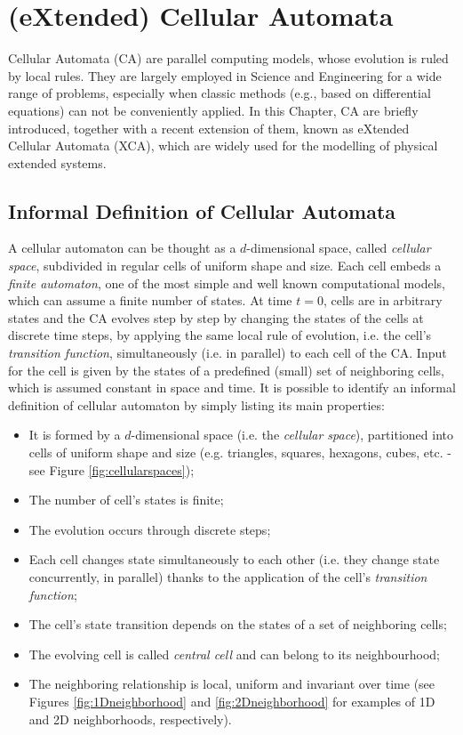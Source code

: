 \chapter{(eXtended) Cellular Automata}

Cellular Automata (CA) are parallel computing models, whose evolution
is ruled by local rules. They are largely employed in Science and
Engineering for a wide range of problems, especially when classic
methods (e.g., based on differential equations) can not be conveniently
applied. In this Chapter, CA are briefly introduced, together with a
recent extension of them, known as eXtended Cellular Automata (XCA),
which are widely used for the modelling of physical extended systems.


\section{Informal Definition of Cellular Automata}

A cellular automaton can be thought as a $d$-dimensional space, called
\emph{cellular space}, subdivided in regular cells of uniform shape
and size. Each cell embeds a \emph{finite automaton}, one of
the most simple and well known computational models, which can assume a finite number of states. At time $t=0$,
cells are in arbitrary states and the CA evolves step by step by
changing the states of the cells at discrete time steps, by applying
the same local rule of evolution, i.e. the cell's \emph{transition
  function}, simultaneously (i.e. in parallel) to each cell of the
CA. Input for the cell is given by the states of a predefined (small) set of
neighboring cells, which is assumed constant in space and time. It is
possible to identify an informal definition of cellular automaton by
simply listing its main properties:

\begin{itemize}
\item It is formed by a $d$-dimensional space (i.e. the \emph{cellular
  space}), partitioned into cells of uniform shape and size
  (e.g. triangles, squares, hexagons, cubes, etc. - see Figure
  \ref{fig:cellularspaces});
\item The number of cell's states is finite;
\item The evolution occurs through discrete steps;
\item Each cell changes state simultaneously to each other (i.e. they
  change state concurrently, in parallel) thanks to the application of
  the cell's \emph{transition function};
\item The cell's state transition depends on the states of a set of neighboring cells;
\item The evolving cell is called \emph{central cell} and can belong
  to its neighbourhood;
\item The neighboring relationship is local, uniform and invariant
  over time (see Figures \ref{fig:1Dneighborhood} and
  \ref{fig:2Dneighborhood} for examples of 1D and 2D neighborhoods,
  respectively).
\end{itemize}

